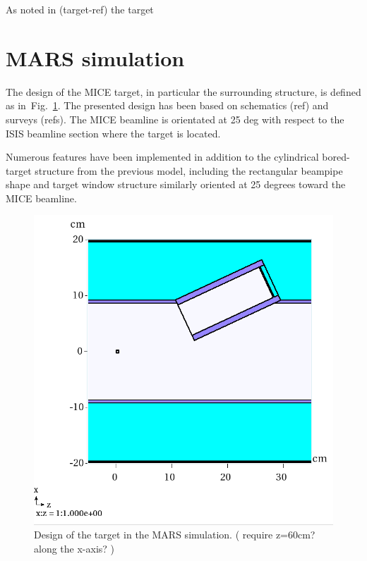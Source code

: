 \documentclass[a4paper,11pt]{article}
\begin{document}
As noted in (target-ref) the target 

\section{MARS simulation}

The design of the MICE target, in particular the surrounding structure, is defined as in~Fig.~\ref{fig:MARSvent}. The presented design has been based on schematics (ref) and surveys (refs). The MICE beamline is orientated at 25 deg with respect to the ISIS beamline section where the target is located.

Numerous features have been implemented in addition to the cylindrical bored-target structure from the previous model, including the rectangular beampipe shape and target window structure similarly oriented at 25 degrees toward the MICE beamline. 

\begin{figure}[t!]
  \begin{center}
    \includegraphics[width=1.0\columnwidth]{./figures/MARSv2TargetVent.png}
    \caption{Design of the target in the MARS simulation. ( require z=60cm?along the x-axis? ) }
    \label{fig:MARSvent}
  \end{center}
\end{figure}
\end{document}
